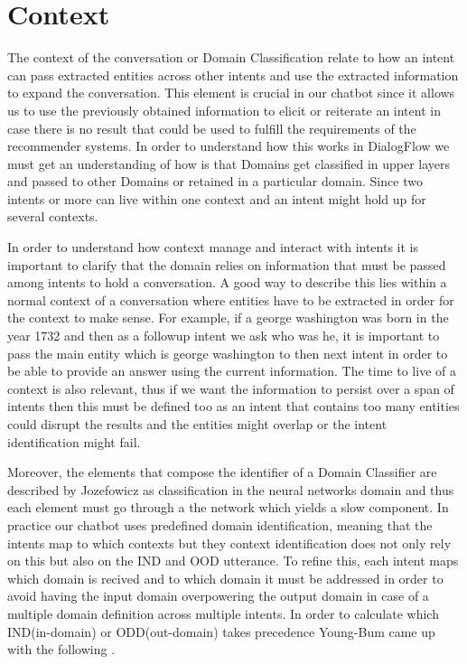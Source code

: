 \section{Context}

The context of the conversation or Domain Classification relate to how an intent can pass extracted entities across other intents and use the extracted information to expand the conversation. This element is crucial in our chatbot since it allows us to use the previously obtained information to elicit or reiterate an intent in case there is no result that could be used to fulfill the requirements of the recommender systems. In order to understand how this works in DialogFlow we must get an understanding of how is that Domains get classified in upper layers and passed to other Domains or retained in a particular domain. Since two intents or more can live within one context and an intent might hold up for several contexts.

In order to understand how context manage and interact with intents it is important to clarify that the domain relies on information that must be passed among intents to hold a conversation. A good way to describe this lies within a normal context of a conversation where entities have to be extracted in order for the context to make sense. For example, if a george washington was born in the year 1732 and then as a followup intent we ask who was he, it is important to pass the main entity which is george washington to then next intent in order to be able to provide an answer using the current information. The time to live of a context is also relevant, thus if we want the information to persist over a span of intents then this must be defined too as an intent that contains too many entities could disrupt the results and the entities might overlap or the intent identification might fail.

Moreover, the elements that compose the identifier of a Domain Classifier are described by Jozefowicz \cite{domainclassifier} as classification in the neural networks domain and thus each element must go through a the network which yields a slow component. In practice our chatbot uses predefined domain identification, meaning that the intents map to which contexts but they context identification does not only rely on this but also on the IND and OOD utterance. To refine this, each intent maps which domain is recived and to which domain it must be addressed in order to avoid having the input domain overpowering the output domain in case of a multiple domain definition across multiple intents. In order to calculate which IND(in-domain) or ODD(out-domain) takes precedence Young-Bum came up with the following \cite{formulaDomainClassifier}.

